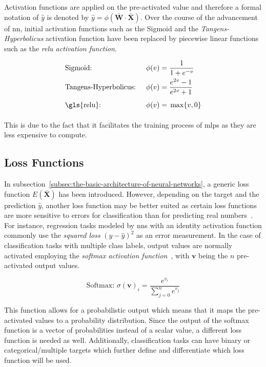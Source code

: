 \documentclass[draft,final]{vutinfth} %
\newcommand{\p}[1]{see p. #1}
\begin{document}
    \footnotetext{\cite[\p{13}]{aggarwal_neural_2018}}

    Activation functions are applied on the pre-activated value and therefore a formal notation of $\hat{y}$ is denoted by $\hat{y}=\phi(\bar{\boldsymbol{W}}\cdot\bar{\boldsymbol{X}})$.
    Over the course of the advancement of \gls{nn}, initial activation functions such as the Sigmoid and the \textit{Tangens-Hyperbolicus} activation function have been replaced by piecewise linear functions such as the \textit{\gls{relu} activation function}.

    \begin{align*}
        &\text{Sigmoid: } &  \phi(v) & = \frac{1}{1+e^{-v}} \\
        &\text{Tangens-Hyperbolicus: } &  \phi(v) &= \frac{e^{2v}-1}{e^{2v}+1} \\
        &\text{\gls{relu}: } &  \phi(v)& = \vphantom{\frac11} \max\{v,0\}
    \end{align*}

    This is due to the fact that it facilitates the training process of \glspl{mlp} as they are less expensive to compute.

    \subsection{Loss Functions}\label{subsec:loss-functions}
    In subsection~\ref{subsec:the-basic-architecture-of-neural-networks}, a generic loss function $E(\bar{\boldsymbol{X}})$ has been introduced.
    However, depending on the target and the prediction $\hat{y}$, another loss function may be better suited as certain loss functions are more sensitive to errors for classification than for predicting real numbers~\citep{aggarwal_neural_2018}.
    For instance, regression tasks modeled by \glspl{nn} with an identity activation function commonly use the \textit{squared loss} $(y - \hat{y})^2$ as an error measurement.
    In the case of classification tasks with multiple class labels, output values are normally activated employing the \textit{softmax activation function}~\citep{goodfellow_deep_2016}, with $\boldsymbol{v}$ being the $n$ pre-activated output values.

    \[
        \text{Softmax: } \sigma(\boldsymbol{v})_i = \frac{e^{v_i}}{\sum_{j=0}^{n}e^{v_j}}
    \]

    This function allows for a probabilistic output which means that it maps the pre-activated values to a probability distribution.
    Since the output of the softmax function is a vector of probabilities instead of a scalar value, a different loss function is needed as well.
    Additionally, classification tasks can have binary or categorical/multiple targets which further define and differentiate which loss function will be used.
\end{document}

